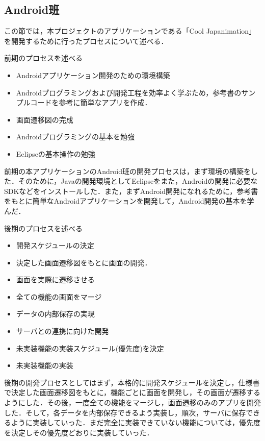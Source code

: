 \subsection{Android班}
\par この節では，本プロジェクトのアプリケーションである「Cool Japanimation」を開発するために行ったプロセスについて述べる．
\\
\par 前期のプロセスを述べる
\\
\begin{itemize}
\item Androidアプリケーション開発のための環境構築
\item Androidプログラミングおよび開発工程を効率よく学ぶため，参考書のサンプルコードを参考に簡単なアプリを作成．
\item 画面遷移図の完成
\item Androidプログラミングの基本を勉強
\item Eclipseの基本操作の勉強
\end{itemize}

\par
前期の本アプリケーションのAndroid班の開発プロセスは，まず環境の構築をした．そのために，Javaの開発環境としてEclipseをまた，Androidの開発に必要なSDKなどをインストールした．また，まずAndroid開発になれるために，参考書をもとに簡単なAndroidアプリケーションを開発して，Android開発の基本を学んだ．

\par 後期のプロセスを述べる
\\
\begin{itemize}
\item 開発スケジュールの決定
\item 決定した画面遷移図をもとに画面の開発．
\item 画面を実際に遷移させる
\item 全ての機能の画面をマージ
\item データの内部保存の実現
\item サーバとの連携に向けた開発
\item 未実装機能の実装スケジュール(優先度)を決定
\item 未実装機能の実装
\end{itemize}

\par
後期の開発プロセスとしてはまず，本格的に開発スケジュールを決定し，仕様書で決定した画面遷移図をもとに，機能ごとに画面を開発し，その画面が遷移するようにした．その後，一度全ての機能をマージし，画面遷移のみのアプリを開発した．そして，各データを内部保存できるよう実装し，順次，サーバに保存できるように実装していった．まだ完全に実装できていない機能については，優先度を決定しその優先度どおりに実装していった．


